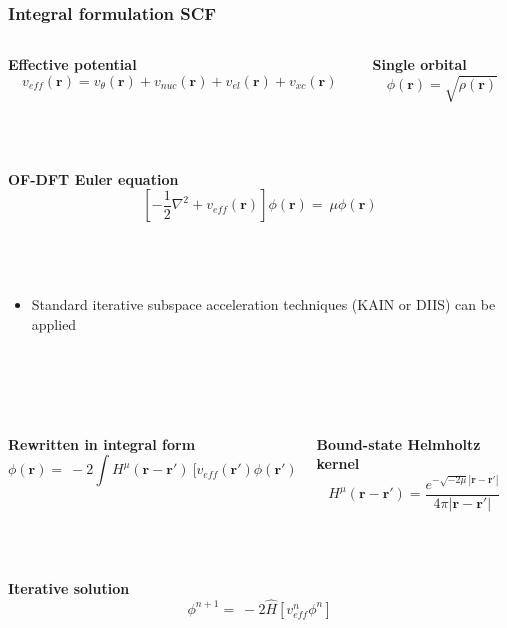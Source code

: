 \documentclass[mathserif, 8pt]{beamer}
\begin{document}
\begin{frame}
    \frametitle{Integral formulation SCF}
    \begin{columns}
    \begin{column}{.5\textwidth}
    \centering
    \textbf{Effective potential}
    \begin{equation}
	\nonumber
	v_{eff}(\boldsymbol{r}) = v_\theta(\boldsymbol{r}) + v_{nuc}(\boldsymbol{r}) + 
	v_{el}(\boldsymbol{r}) + v_{xc}(\boldsymbol{r})
    \end{equation}
    \end{column}
    \begin{column}{.5\textwidth}
    \centering
    \textbf{Single orbital}
    \begin{equation}
	\nonumber
	\phi(\boldsymbol{r}) = \sqrt{\rho(\boldsymbol{r})}
    \end{equation}
    \end{column}
    \end{columns}
    \ \\
    \ \\
    \centering
    \textbf{OF-DFT Euler equation}
    \begin{equation}
	\nonumber
	\left[-\frac{1}{2}\nabla^2 + v_{eff}(\boldsymbol{r})\right]
	\phi(\boldsymbol{r}) =\ \mu \phi(\boldsymbol{r})
    \end{equation}
    \ \\
    \ \\
    \ \\
    \begin{itemize}
	\item	Standard iterative subspace acceleration techniques (KAIN or DIIS) can be applied
    \end{itemize}
    \ \\
    \ \\
    \ \\
    \begin{columns}
    \begin{column}{.5\textwidth}
    \centering
    \textbf{Rewritten in integral form}
    \begin{equation}
	\nonumber
	\phi(\boldsymbol{r}) =\ -2\int H^{\mu}(\boldsymbol{r}-\boldsymbol{r}')\
	    \Big[v_{eff}(\boldsymbol{r}') \phi(\boldsymbol{r}')\Big] d\boldsymbol{r}'
    \end{equation}
    \end{column}
    \begin{column}{.5\textwidth}
    \centering
    \textbf{Bound-state Helmholtz kernel}
    \begin{equation}
	\nonumber
	H^\mu(\boldsymbol{r}-\boldsymbol{r}') = \frac{e^{-\sqrt{-2\mu}|\boldsymbol{r}-\boldsymbol{r}'|}}{4\pi|\boldsymbol{r}-\boldsymbol{r}'|}
    \end{equation}
    \end{column}
    \end{columns}
    \ \\
    \ \\
    \textbf{Iterative solution}
    \begin{equation}
	\nonumber
	\phi^{n+1} =\ -2\hat{H}\left[v_{eff}^n\phi^n\right]
    \end{equation}
\end{frame}
\end{document}
